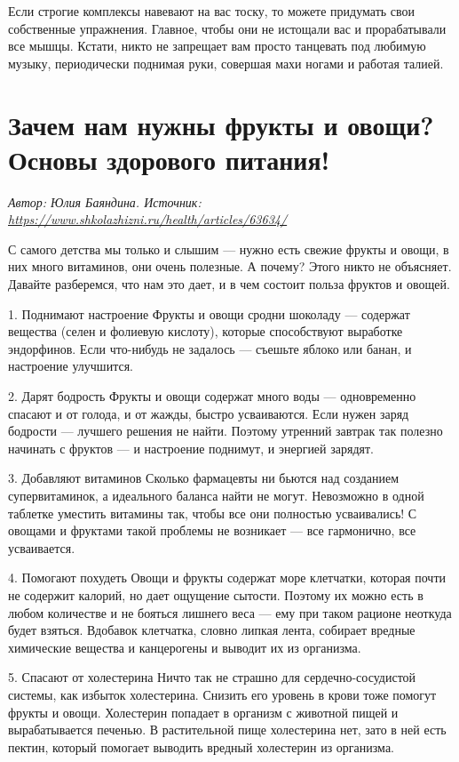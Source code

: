 Если строгие комплексы навевают на вас тоску, то можете придумать свои собственные упражнения. Главное, чтобы они не истощали вас и прорабатывали все мышцы. Кстати, никто не запрещает вам просто танцевать под любимую музыку, периодически поднимая руки, совершая махи ногами и работая талией.


\section{Зачем нам нужны фрукты и овощи? Основы здорового питания!}
\textit{Автор: Юлия Баяндина.
    Источник: \url{https://www.shkolazhizni.ru/health/articles/63634/}}

С самого детства мы только и слышим — нужно есть свежие фрукты и овощи, в них много витаминов, они очень полезные. А почему? Этого никто не объясняет. Давайте разберемся, что нам это дает, и в чем состоит польза фруктов и овощей.

1. Поднимают настроение
Фрукты и овощи сродни шоколаду — содержат вещества (селен и фолиевую кислоту), которые способствуют выработке эндорфинов. Если что-нибудь не задалось — съешьте яблоко или банан, и настроение улучшится.

2. Дарят бодрость Фрукты и овощи содержат много воды — одновременно спасают и от голода, и от жажды, быстро усваиваются. Если нужен заряд бодрости — лучшего решения не найти. Поэтому утренний завтрак так полезно начинать с фруктов — и настроение поднимут, и энергией зарядят.

3. Добавляют витаминов Сколько фармацевты ни бьются над созданием супервитаминок, а идеального баланса найти не могут. Невозможно в одной таблетке уместить витамины так, чтобы все они полностью усваивались! С овощами и фруктами такой проблемы не возникает — все гармонично, все усваивается.

4. Помогают похудеть Овощи и фрукты содержат море клетчатки, которая почти не содержит калорий, но дает ощущение сытости. Поэтому их можно есть в любом количестве и не бояться лишнего веса — ему при таком рационе неоткуда будет взяться. Вдобавок клетчатка, словно липкая лента, собирает вредные химические вещества и канцерогены и выводит их из организма.

5. Спасают от холестерина Ничто так не страшно для сердечно-сосудистой системы, как избыток холестерина. Снизить его уровень в крови тоже помогут фрукты и овощи. Холестерин попадает в организм с животной пищей и вырабатывается печенью. В растительной пище холестерина нет, зато в ней есть пектин, который помогает выводить вредный холестерин из организма.

